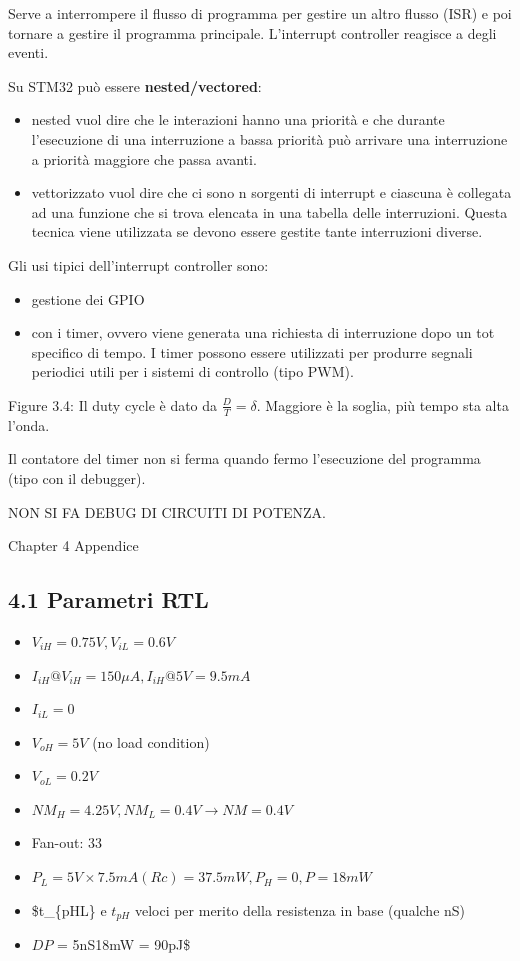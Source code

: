 \documentclass[
]{article}
\providecommand{\tightlist}{%
  \setlength{\itemsep}{0pt}\setlength{\parskip}{0pt}}
\begin{document}
Serve a interrompere il flusso di programma per gestire un altro flusso
(ISR) e poi tornare a gestire il programma principale. L'interrupt
controller reagisce a degli eventi.

Su STM32 può essere \textbf{nested/vectored}:

\begin{itemize}
\tightlist
\item
  nested vuol dire che le interazioni hanno una priorità e che durante
  l'esecuzione di una interruzione a bassa priorità può arrivare una
  interruzione a priorità maggiore che passa avanti.\\
\item
  vettorizzato vuol dire che ci sono n sorgenti di interrupt e ciascuna
  è collegata ad una funzione che si trova elencata in una tabella delle
  interruzioni. Questa tecnica viene utilizzata se devono essere gestite
  tante interruzioni diverse.
\end{itemize}

Gli usi tipici dell'interrupt controller sono:

\begin{itemize}
\tightlist
\item
  gestione dei GPIO
\item
  con i timer, ovvero viene generata una richiesta di interruzione dopo
  un tot specifico di tempo. I timer possono essere utilizzati per
  produrre segnali periodici utili per i sistemi di controllo (tipo
  PWM).
\end{itemize}

Figure 3.4: Il duty cycle è dato da \(\frac{D}{T}=\delta\). Maggiore è
la soglia, più tempo sta alta l'onda.

Il contatore del timer non si ferma quando fermo l'esecuzione del
programma (tipo con il debugger).

NON SI FA DEBUG DI CIRCUITI DI POTENZA.

Chapter 4 Appendice

\subsection{4.1 Parametri RTL}\label{parametri-rtl}

\begin{itemize}
\tightlist
\item
  \(V_{iH} = 0.75V, V_{iL} = 0.6V\)
\item
  \(I_{iH} @ V_{iH} = 150 \mu A, I_{iH} @ 5V = 9.5mA\)
\item
  \(I_{iL} = 0\)
\item
  \(V_{oH} = 5V\) (no load condition)
\item
  \(V_{oL} = 0.2V\)
\item
  \(NM_{H} = 4.25V, NM_{L} = 0.4V \to NM = 0.4V\)
\item
  Fan-out: 33
\item
  \(P_{L} = 5V\times 7.5mA (Rc) = 37.5mW, P_{H} = 0, P =18mW\)
\item
  \$t\_\{pHL\} e \(t_{pH}\) veloci per merito della resistenza in base
  (qualche nS)
\item
  \(DP\) = 5nS\times 18mW = 90pJ\$
\end{itemize}
\end{document}

